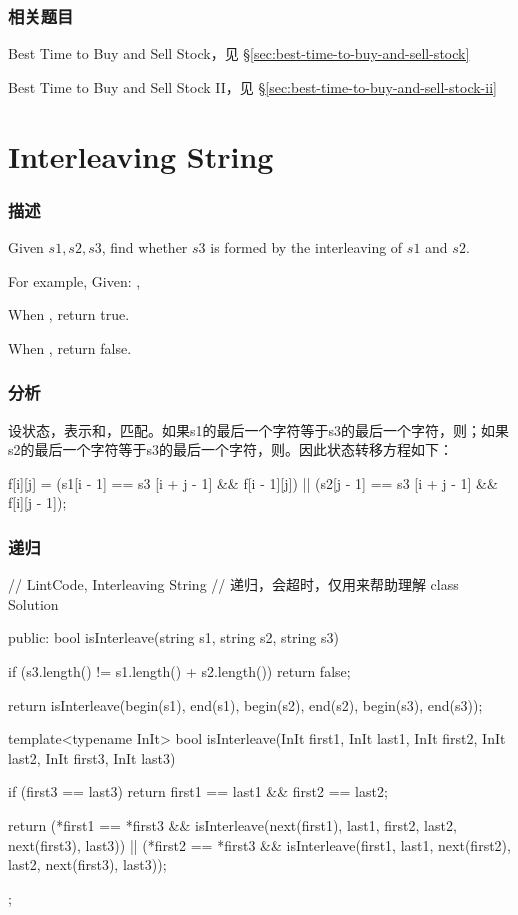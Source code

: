 \subsubsection{相关题目}
\begindot
\item Best Time to Buy and Sell Stock，见 \S \ref{sec:best-time-to-buy-and-sell-stock}
\item Best Time to Buy and Sell Stock II，见 \S \ref{sec:best-time-to-buy-and-sell-stock-ii}
\myenddot


\section{Interleaving String} %
\label{sec:interleaving-string}


\subsubsection{描述}
Given $s1, s2, s3$, find whether $s3$ is formed by the interleaving of $s1$ and $s2$.

For example, Given: ,

When , return true.

When , return false.


\subsubsection{分析}
设状态，表示和，匹配。如果s1的最后一个字符等于s3的最后一个字符，则；如果s2的最后一个字符等于s3的最后一个字符，则。因此状态转移方程如下：
\begin{Code}
f[i][j] = (s1[i - 1] == s3 [i + j - 1] && f[i - 1][j])
       || (s2[j - 1] == s3 [i + j - 1] && f[i][j - 1]);
\end{Code}


\subsubsection{递归}
\begin{Code}
// LintCode, Interleaving String
// 递归，会超时，仅用来帮助理解
class Solution {
public:
    bool isInterleave(string s1, string s2, string s3) {
        if (s3.length() != s1.length() + s2.length())
            return false;

        return isInterleave(begin(s1), end(s1), begin(s2), end(s2),
                begin(s3), end(s3));
    }

    template<typename InIt>
    bool isInterleave(InIt first1, InIt last1, InIt first2, InIt last2,
            InIt first3, InIt last3) {
        if (first3 == last3)
            return first1 == last1 && first2 == last2;

        return (*first1 == *first3
                && isInterleave(next(first1), last1, first2, last2,
                        next(first3), last3))
                || (*first2 == *first3
                        && isInterleave(first1, last1, next(first2), last2,
                                next(first3), last3));
    }
};
\end{Code}


